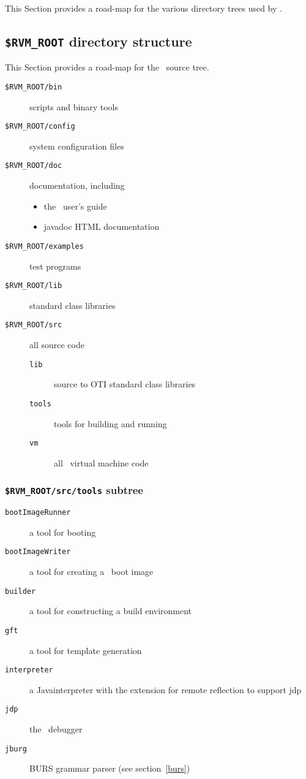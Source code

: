 This Section provides a road-map for the various directory trees used by \jp .

\subsection{{\tt \$RVM\_ROOT} directory structure}\label{rvmroot}

This Section provides a road-map for the \jp\ source tree.

\begin{description}
 
\item [{\tt \$RVM\_ROOT/bin}] scripts and binary tools
\item [{\tt \$RVM\_ROOT/config}] system configuration files
\item [{\tt \$RVM\_ROOT/doc}] documentation, including
   \begin{itemize}
   \item the \jp\ user's guide
   \item javadoc HTML documentation
   \end{itemize}
\item [{\tt \$RVM\_ROOT/examples}] test programs
\item [{\tt \$RVM\_ROOT/lib}] standard class libraries
\item [{\tt \$RVM\_ROOT/src}] all source code
   \begin{description}
   \item [{\tt lib}] source to OTI standard class libraries
   \item [{\tt tools}] tools for building and running \jp
   \item [{\tt vm}] all \jp\ virtual machine code
   \end{description}
\end{description}

\subsubsection{{\tt \$RVM\_ROOT/src/tools} subtree}

\begin{description}
\item [{\tt bootImageRunner}] a tool for booting \jp
\item [{\tt bootImageWriter}] a tool for creating a \jp\ boot image
\item [{\tt builder}] a tool for constructing a build environment
\item [{\tt gft}] a tool for template generation
\item [{\tt interpreter}] a Java\trademark interpreter with the extension for remote reflection to support jdp
\item [{\tt jdp}] the \jp\ debugger
\item [{\tt jburg}] BURS grammar parser (see section~\ref{burs})
\end{description}

